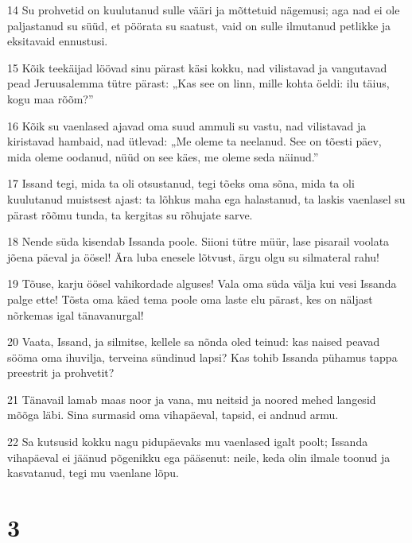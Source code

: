 \par 14 Su prohvetid on kuulutanud sulle vääri ja mõttetuid nägemusi; aga nad ei ole paljastanud su süüd, et pöörata su saatust, vaid on sulle ilmutanud petlikke ja eksitavaid ennustusi.
\par 15 Kõik teekäijad löövad sinu pärast käsi kokku, nad vilistavad ja vangutavad pead Jeruusalemma tütre pärast: „Kas see on linn, mille kohta öeldi: ilu täius, kogu maa rõõm?”
\par 16 Kõik su vaenlased ajavad oma suud ammuli su vastu, nad vilistavad ja kiristavad hambaid, nad ütlevad: „Me oleme ta neelanud. See on tõesti päev, mida oleme oodanud, nüüd on see käes, me oleme seda näinud.”
\par 17 Issand tegi, mida ta oli otsustanud, tegi tõeks oma sõna, mida ta oli kuulutanud muistsest ajast: ta lõhkus maha ega halastanud, ta laskis vaenlasel su pärast rõõmu tunda, ta kergitas su rõhujate sarve.
\par 18 Nende süda kisendab Issanda poole. Siioni tütre müür, lase pisarail voolata jõena päeval ja öösel! Ära luba enesele lõtvust, ärgu olgu su silmateral rahu!
\par 19 Tõuse, karju öösel vahikordade alguses! Vala oma süda välja kui vesi Issanda palge ette! Tõsta oma käed tema poole oma laste elu pärast, kes on näljast nõrkemas igal tänavanurgal!
\par 20 Vaata, Issand, ja silmitse, kellele sa nõnda oled teinud: kas naised peavad sööma oma ihuvilja, terveina sündinud lapsi? Kas tohib Issanda pühamus tappa preestrit ja prohvetit?
\par 21 Tänavail lamab maas noor ja vana, mu neitsid ja noored mehed langesid mõõga läbi. Sina surmasid oma vihapäeval, tapsid, ei andnud armu.
\par 22 Sa kutsusid kokku nagu pidupäevaks mu vaenlased igalt poolt; Issanda vihapäeval ei jäänud põgenikku ega pääsenut: neile, keda olin ilmale toonud ja kasvatanud, tegi mu vaenlane lõpu.

\chapter{3}

